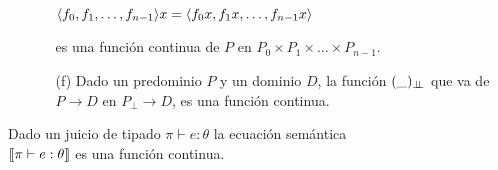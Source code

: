 \begin{proposition}
\begin{enumerate}
\begin{enumerate}
\begin{center}
$\langle f_0,f_1,\ldots,f_{n-1} \rangle x = \langle f_0 x,f_1 x,\ldots,f_{n-1} x \rangle$
\end{center}

es una funci\'on continua de $P$ en $P_0 \times P_1 \times \ldots \times P_{n-1}$.

\item[(f)] Dado un predominio $P$ y un dominio $D$, la funci\'on $(\_)_{\bot \!\!\! \bot}$ que va
de $P \rightarrow D$ en $P_{\bot} \rightarrow D$, es una funci\'on continua.

\end{enumerate}

\end{enumerate}

\end{proposition}

\begin{theorem}

Dado un juicio de tipado $\pi \vdash e : \theta$ la ecuaci\'on sem\'antica
\\ 
$\llbracket \pi \vdash e : \theta \rrbracket$ es una funci\'on continua.

\end{theorem}

